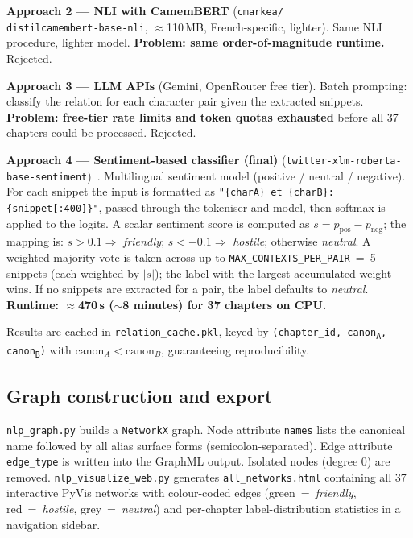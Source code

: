 \documentclass[a4paper]{article}
\begin{document}
\textbf{Approach 2 --- NLI with CamemBERT} (\texttt{cmarkea/\\
distilcamembert-base-nli}, $\approx$110\,MB, French-specific, lighter).
Same NLI procedure, lighter model.
\textbf{Problem: same order-of-magnitude runtime.} Rejected.

\textbf{Approach 3 --- LLM APIs} (Gemini, OpenRouter free tier).
Batch prompting: classify the relation for each character pair
given the extracted snippets.
\textbf{Problem: free-tier rate limits and token quotas exhausted}
before all 37 chapters could be processed. Rejected.

\textbf{Approach 4 --- Sentiment-based classifier (final)}
(\texttt{twitter-xlm-roberta-base-sentiment})~\cite{Barbieri2020}.
Multilingual sentiment model (positive / neutral / negative).
For each snippet the input is formatted as
\texttt{"\{charA\} et \{charB\}: \{snippet[:400]\}"},
passed through the tokeniser and model, then softmax is applied
to the logits. A scalar sentiment score is computed as
$s = p_{\text{pos}} - p_{\text{neg}}$; the mapping is:
$s > 0.1 \Rightarrow$ \textit{friendly};
$s < -0.1 \Rightarrow$ \textit{hostile};
otherwise \textit{neutral}.
A weighted majority vote is taken across up to
\texttt{MAX\_CONTEXTS\_PER\_PAIR}~=~5 snippets
(each weighted by $|s|$); the label with the largest accumulated
weight wins. If no snippets are extracted for a pair, the label
defaults to \textit{neutral}.
\textbf{Runtime: $\approx$470\,s ($\sim$8 minutes) for 37 chapters on CPU.}

Results are cached in \texttt{relation\_cache.pkl}, keyed by
\texttt{(chapter\_id, canon\textsubscript{A}, canon\textsubscript{B})}
with $\text{canon}_A < \text{canon}_B$, guaranteeing reproducibility.

\subsection{Graph construction and export}

\texttt{nlp\_graph.py} builds a \texttt{NetworkX} graph. Node attribute
\texttt{names} lists the canonical name followed by all alias surface forms
(semicolon-separated). Edge attribute \texttt{edge\_type} is written into
the GraphML output. Isolated nodes (degree 0) are removed.
\texttt{nlp\_visualize\_web.py} generates \texttt{all\_networks.html}
containing all 37 interactive PyVis networks with colour-coded edges
(green~=~\textit{friendly}, red~=~\textit{hostile}, grey~=~\textit{neutral})
and per-chapter label-distribution statistics in a navigation sidebar.
\end{document}
